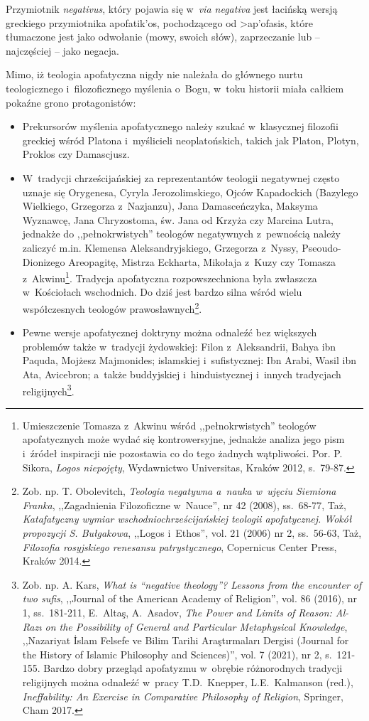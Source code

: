 Przymiotnik \textit{negativus}, który pojawia się w~\textit{via negativa} jest łacińską wersją greckiego przymiotnika \textgreek{apofatik'os}, pochodzącego od \textgreek{>ap'ofasis}, które tłumaczone jest jako odwołanie (mowy, swoich słów), zaprzeczanie lub -- najczęściej -- jako negacja.

Mimo, iż teologia apofatyczna nigdy nie należała do głównego nurtu teologicznego i~filozoficznego myślenia o~Bogu, w~toku historii miała całkiem pokaźne grono protagonistów:

\begin{itemize}
\item Prekursorów myślenia apofatycznego należy szukać w~klasycznej filozofii greckiej wśród Platona i~myślicieli neoplatońskich, takich jak Platon, Plotyn, Proklos czy Damascjusz.
\item W~tradycji chrześcijańskiej za reprezentantów teologii negatywnej często uznaje się Orygenesa, Cyryla Jerozolimskiego, Ojców Kapadockich (Bazylego Wielkiego, Grzegorza z~Nazjanzu), Jana Damasceńczyka, Maksyma Wyznawcę, Jana Chryzostoma, św. Jana od Krzyża czy Marcina Lutra, jednakże do ,,pełnokrwistych'' teologów negatywnych z~pewnością należy zaliczyć m.in. Klemensa Aleksandryjskiego, Grzegorza z~Nyssy, Pseoudo-Dionizego Areopagitę, Mistrza Eckharta, Mikołaja z~Kuzy czy Tomasza z~Akwinu\footnote{Umieszczenie Tomasza z~Akwinu wśród ,,pełnokrwistych'' teologów apofatycznych może wydać się kontrowersyjne, jednakże analiza jego pism i~źródeł inspiracji nie pozostawia co do tego żadnych wątpliwości. Por. P. Sikora, \textit{Logos niepojęty}, Wydawnictwo Universitas, Kraków 2012, s.~79-87.}. Tradycja apofatyczna rozpowszechniona była zwłaszcza w~Kościołach wschodnich. Do dziś jest bardzo silna wśród wielu współczesnych teologów prawosławnych\footnote{Zob. np. T. Obolevitch, \textit{Teologia negatywna a~nauka w~ujęciu Siemiona Franka}, ,,Zagadnienia Filozoficzne w~Nauce'', nr 42 (2008), ss.~68-77, Taż, \textit{Katafatyczny wymiar wschodniochrześcijańskiej teologii apofatycznej. Wokół propozycji S. Bułgakowa}, ,,Logos i~Ethos'', vol. 21 (2006) nr 2, ss.~56-63, Taż, \textit{Filozofia rosyjskiego renesansu patrystycznego}, Copernicus Center Press, Kraków 2014.}.
\item Pewne wersje apofatycznej doktryny można odnaleźć bez większych problemów także w~tradycji żydowskiej: Filon z~Aleksandrii, Bahya ibn Paquda, Mojżesz Majmonides; islamskiej i~sufistycznej: Ibn Arabi, Wasil ibn Ata, Avicebron; a~także buddyjskiej i~hinduistycznej i~innych tradycjach religijnych\footnote{Zob. np. A. Kars, \textit{What is ``negative theology''? Lessons from the encounter of two sufis}, ,,Journal of the American Academy of Religion'', vol. 86 (2016), nr 1, ss.~181-211, E.~Altaş, A.~Asadov, \textit{The Power and Limits of Reason: Al-Razı on the Possibility of General and Particular Metaphysical Knowledge}, ,,Nazariyat İslam Felsefe ve Bilim Tarihi Araştırmaları Dergisi (Journal for the History of Islamic Philosophy and Sciences)'', vol. 7 (2021), nr 2, s.~121-155. Bardzo dobry przegląd apofatyzmu w~obrębie różnorodnych tradycji religijnych można odnaleźć w~pracy T.D.~Knepper, L.E.~Kalmanson (red.), \textit{Ineffability: An Exercise in Comparative Philosophy of Religion}, Springer, Cham 2017.}.
\end{itemize}
